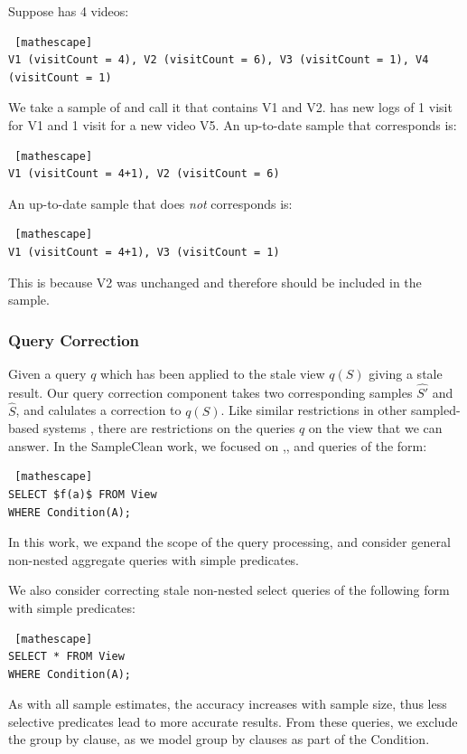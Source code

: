 \begin{example}[Correspondence]
Suppose  has 4 videos: 
\begin{lstlisting} [mathescape]
V1 (visitCount = 4), V2 (visitCount = 6), V3 (visitCount = 1), V4 (visitCount = 1)
\end{lstlisting}
We take a sample of  and call it  that contains V1 and V2.
 has new logs of 1 visit for V1 and 1 visit for a new video V5.
An up-to-date sample that corresponds is:
\begin{lstlisting} [mathescape]
V1 (visitCount = 4+1), V2 (visitCount = 6)
\end{lstlisting}
An up-to-date sample that does \emph{not} corresponds is: 
\begin{lstlisting} [mathescape]
V1 (visitCount = 4+1), V3 (visitCount = 1)
\end{lstlisting}
This is because V2 was unchanged and therefore should be included in the sample.
\end{example}

\subsubsection{Query Correction}
Given a query $q$ which has been applied to the stale view $q(S)$ giving a stale result.
Our query correction component takes two corresponding samples $\hat{S'}$ and $\hat{S}$, and calulates a correction to $q(S)$.
Like similar restrictions in other sampled-based systems \cite{agarwalknowing}, there are restrictions on the queries $q$ on the view that we can answer. 
In the SampleClean work, we focused on \sumfunc,\countfunc, and \avgfunc queries of the form: 
\begin{lstlisting} [mathescape]
SELECT $f(a)$ FROM View 
WHERE Condition(A);
\end{lstlisting}
In this work, we expand the scope of the query processing, and consider general non-nested aggregate queries with simple predicates.

We also consider correcting stale non-nested select queries of the following form with simple predicates:
\begin{lstlisting} [mathescape]
SELECT * FROM View 
WHERE Condition(A);
\end{lstlisting}
As with all sample estimates, the accuracy increases with sample size, thus less selective predicates lead to more accurate results.
From these queries, we exclude the group by clause, as we model group by clauses as part of the \textsf{Condition}.

